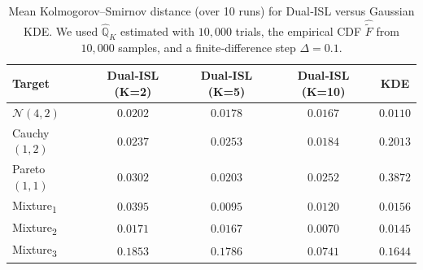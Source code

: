 \documentclass{article}
\begin{document}
\begin{table}[h]
  \centering
  \small                           %
  \setlength{\tabcolsep}{3pt}      %
    \begin{tabular}{lcccc}
      \toprule
      \textbf{Target} 
        & \textbf{Dual‐ISL (K=2)}
        & \textbf{Dual‐ISL (K=5)}
        & \textbf{Dual‐ISL (K=10)} 
        & \textbf{KDE} \\
      \midrule
      \(\mathcal{N}(4,2)\)  
        & \(0.0202\)
        & \(0.0178\)
        & \(0.0167\)
        & \(\mathbf{0.0110}\)\\
      Cauchy\((1,2)\)    
        & \(0.0237\) 
        & \(0.0253\)
        & \(\mathbf{0.0184}\)
        & \(0.2013\)\\
      Pareto\((1,1)\)    
        & \(0.0302\) 
        & \(\mathbf{0.0203}\)
        & \(0.0252\)
        & \(0.3872\)\\
      Mixture\textsubscript{1} 
        & \(0.0395 \)
        & \(\mathbf{0.0095}\)
        & \(0.0120 \)
        & \(0.0156\)\\
      Mixture\textsubscript{2}     
        & \(0.0171\) 
        & \(0.0167\) 
        & \(\mathbf{0.0070}\)
        & \(0.0145\)\\
      Mixture\textsubscript{3}        
        & \(0.1853\) 
        & \(0.1786\)
        & \(\mathbf{0.0741}\)
        & \(0.1644\)\\
      \bottomrule
    \end{tabular}
  \caption{\small Mean Kolmogorov–Smirnov distance (over 10 runs) for Dual‐ISL versus Gaussian KDE.  We used \(\widehat{\mathbb{Q}}_{K}\) estimated with \(10{,}000\) trials, the empirical CDF \(\widehat{\tilde F}\) from \(10{,}000\) samples, and a finite‐difference step \(\Delta=0.1\).}
  \label{Learning1D_table_densities_estimation}
\end{table}
\end{document}
